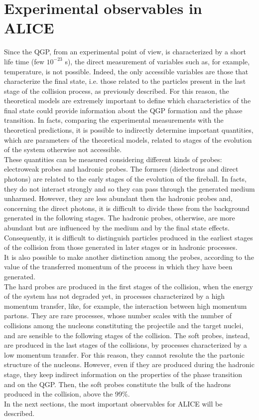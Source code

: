 \section{Experimental observables in ALICE}
Since the QGP, from an experimental point of view, is characterized by a short life time (few $10^{-23}$ s), the direct measurement of variables such as, for example, temperature, is not possible. Indeed, the only accessible variables are those that characterize the final state, i.e. those related to the particles present in the last stage of the collision process, as previously described. For this reason, the theoretical models are extremely important to define which characteristics of the final state could provide information about the QGP formation and the phase transition. In facts, comparing the experimental measurements with the theoretical predictions, it is possible to indirectly determine important quantities, which are parameters of the theoretical models, related to stages of the evolution of the system otherwise not accessible.\\
These quantities can be measured considering different kinds of probes: electroweak probes and hadronic probes. The formers (dielectrons and direct photons) are related to the early stages of the evolution of the fireball. In facts, they do not interact strongly and so they can pass through the generated medium unharmed. However, they are less abundant then the hadronic probes and, concerning the direct photons, it is difficult to divide these from the background generated in the following stages. The hadronic probes, otherwise, are more abundant but are influenced by the medium and by the final state effects. Consequently, it is difficult to distinguish particles produced in the earliest stages of the collision from those generated in later stages or in hadronic processes.\\
It is also possible to make another distinction among the probes, according to the value of the transferred momentum of the process in which they have been generated.\\
The hard probes are produced in the first stages of the collision, when the energy of the system has not degraded yet, in processes characterized by a high momentum transfer, like, for example, the interaction between high momentum partons. They are rare processes, whose number scales with the number of collisions among the nucleons constituting the projectile and the target nuclei, and are sensible to the following stages of the collision. The soft probes, instead, are produced in the last stages of the collisions, by processes characterized by a low momentum transfer. For this reason, they cannot resolute the the partonic structure of the nucleons. However, even if they are produced during the hadronic stage, they keep indirect information on the properties of the phase transition and on the QGP. Then, the soft probes constitute the bulk of the hadrons produced in the collision, above the 99$\%$.\\
In the next sections, the most important observables for ALICE will be described.\\
